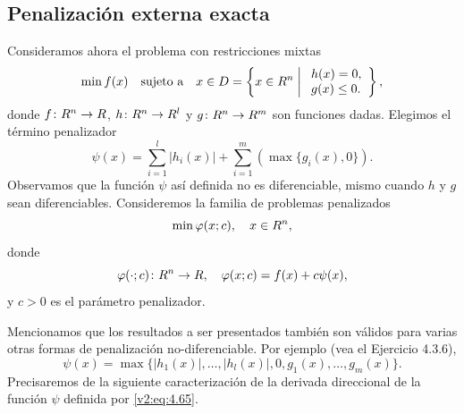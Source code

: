 
\subsection{Penalización externa exacta}\label{v2:sec:4.3.2}

Consideramos ahora el problema con restricciones mixtas
\begin{equation}
    \min f(x) \quad \text{sujeto a} \quad x \in D = \left\{ x \in R^n \;\middle|\; \begin{array}{l} h(x) = 0, \\ g(x) \le 0. \end{array} \right\},
    \label{v2:eq:4.64}
\end{equation}
donde $f \colon R^n \to R$, $h \colon R^n \to R^l$ y $g \colon R^n \to R^m$ son funciones dadas. Elegimos el término penalizador
\begin{equation}
    \psi(x) = \sum_{i=1}^l |h_i(x)| + \sum_{i=1}^m (\max\{g_i(x), 0\}).
    \label{v2:eq:4.65}
\end{equation}
Observamos que la función $\psi$ así definida no es diferenciable, mismo cuando $h$ y $g$ sean diferenciables. Consideremos la familia de problemas penalizados
\begin{equation}
    \min \varphi(x; c), \quad x \in R^n,
    \label{v2:eq:4.66}
\end{equation}
donde
\begin{equation}
    \varphi(\cdot; c) \colon R^n \to R, \quad \varphi(x; c) = f(x) + c\psi(x),
    \label{v2:eq:4.67}
\end{equation}
y $c > 0$ es el parámetro penalizador.

Mencionamos que los resultados a ser presentados también son válidos para varias otras formas de penalización no-diferenciable. Por ejemplo (vea el Ejercicio 4.3.6),
\begin{equation}
    \psi(x) = \max\{|h_1(x)|, \dots, |h_l(x)|, 0, g_1(x), \dots, g_m(x)\}.
    \label{v2:eq:4.68}
\end{equation}
Precisaremos de la siguiente caracterización de la derivada direccional de la función $\psi$ definida por \eqref{v2:eq:4.65}.


